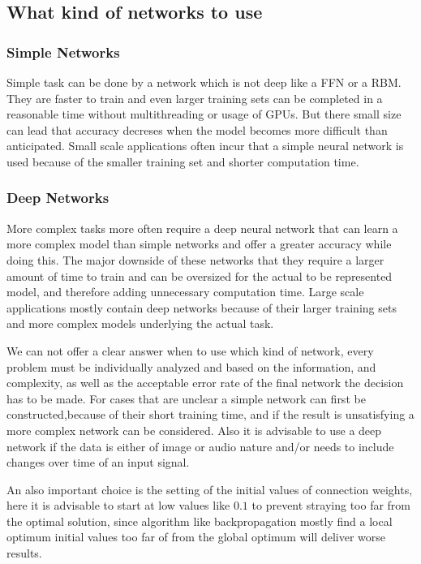 \documentclass[conference]{IEEEtran}
\begin{document}
\subsection{What kind of networks to use}
\subsubsection{Simple Networks}
Simple task can be done by a network which is not deep like a FFN or a RBM. They are faster to train and even larger training sets can be completed in a reasonable time without multithreading or usage of GPUs. But there small size can lead that accuracy decreses when the model becomes more difficult than anticipated. Small scale applications often incur that a simple neural network is used because of the smaller training set and shorter computation time.

\subsubsection{Deep Networks}
More complex tasks more often require a deep neural network that can learn a more complex model than simple networks and offer a greater accuracy while doing this. The major downside of these networks that they require a larger amount of time to train and can be oversized for the actual to be represented model, and therefore adding unnecessary computation time. Large scale applications mostly contain deep networks because of their larger training sets and more complex models underlying the actual task.

We can not offer a clear answer when to use which kind of network, every problem must be individually analyzed and based on the information, and complexity, as well as the acceptable error rate of the final network the decision has to be made. For cases that are unclear a simple network can first be constructed,because of their short training time, and if the result is unsatisfying a more complex network can be considered.  Also it is advisable to use a deep network if the data is either of image or audio nature and/or needs to include changes over time of an input signal\cite{PattersonGibson17}.


An also important choice is the setting of the initial values of connection weights, here it is advisable to start at low values like $0.1$ to prevent straying too far from the optimal solution, since algorithm like backpropagation mostly find a local optimum initial values too far of from the global optimum will deliver worse results.
\end{document}
